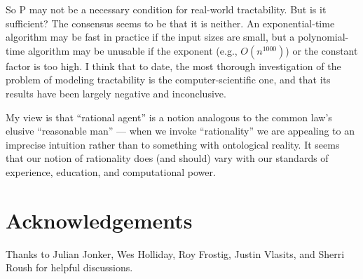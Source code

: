\documentclass[letterpaper,12pt]{article}
\begin{document}
So P may not be a necessary condition for real-world tractability. But is it sufficient? The consensus seems to be that it is neither. An exponential-time algorithm may be fast in practice if the input sizes are small, but a polynomial-time algorithm may be unusable if the exponent (e.g., $O(n^{1000})$) or the constant factor is too high. I think that to date, the most thorough investigation of the problem of modeling tractability is the computer-scientific one, and that its results have been largely negative and inconclusive.

My view is that ``rational agent'' is a notion analogous to the common law's elusive ``reasonable man'' --- when we invoke ``rationality'' we are appealing to an imprecise intuition rather than to something with ontological reality. It seems that our notion of rationality does (and should) vary with our standards of experience, education, and computational power.

\section{Acknowledgements}
Thanks to Julian Jonker, Wes Holliday, Roy Frostig, Justin Vlasits, and Sherri Roush for helpful discussions.
\end{document}
